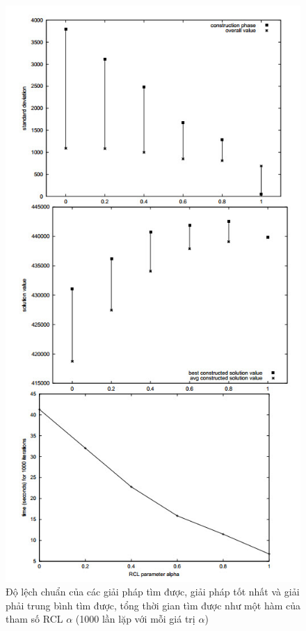 \documentclass[14pt,a4paper]{report}
\begin{document}
\begin{center}
	\begin{figure}[htp]
		\begin{center}
			\includegraphics[scale=.75]{images/hinh1_8}
		\end{center}
		\caption{Độ lệch chuẩn của các giải pháp tìm được, giải pháp tốt nhất và giải phải trung bình tìm được, tổng thời gian tìm được như một hàm của tham số RCL $\alpha$ (1000 lần lặp với mỗi giá trị $\alpha$)}
		\label{refhinh3}
	\end{figure}
\end{center}
\end{document}

